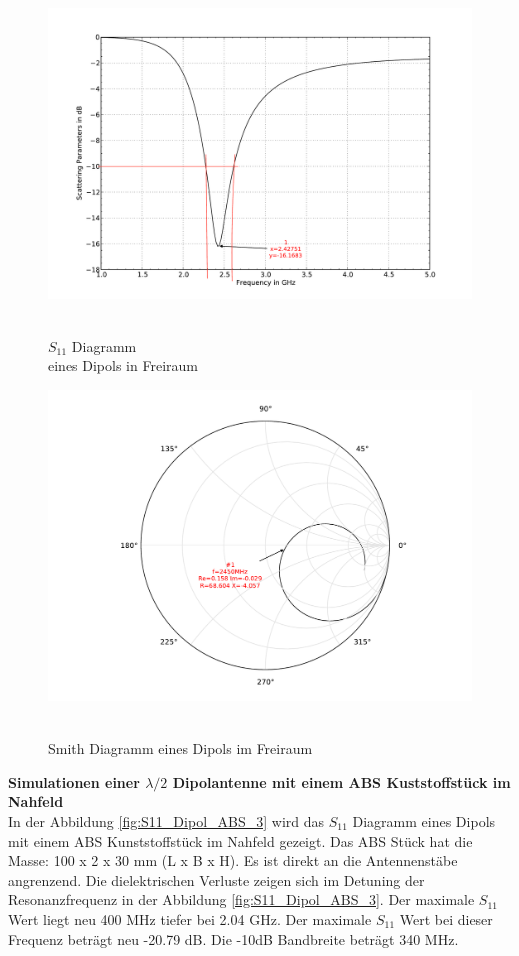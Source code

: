 \begin{figure}[!ht]
\begin{center}
  \includegraphics[width=\linewidth]{content/bilder/Evaluation/Dipol/S11DipolOhneABS.pdf}
  \caption{\\$S_{11}$ Diagramm \\eines Dipols in Freiraum}\label{fig:S11_Dipol_freiraum_1}
\endminipage%
{}
  \includegraphics[width=\linewidth]{content/bilder/Evaluation/Dipol/SmithDipolOhneABS.pdf}
  \caption{\\Smith Diagramm eines Dipols im Freiraum}\label{fig:Smith_Dipol_freiraum_2}
\endminipage
\end{center}
\end{figure}
\textbf{Simulationen einer $\lambda/2$ Dipolantenne mit einem ABS Kuststoffstück im Nahfeld}\\
In der Abbildung \ref{fig:S11_Dipol_ABS_3} wird das $S_{11}$ Diagramm eines Dipols mit einem ABS Kunststoffstück im Nahfeld gezeigt. Das ABS Stück hat die Masse: 100 x 2 x 30 mm (L x B x H). Es ist direkt an die Antennenstäbe angrenzend. Die dielektrischen Verluste zeigen sich im Detuning der Resonanzfrequenz in der Abbildung \ref{fig:S11_Dipol_ABS_3}. Der maximale $S_{11}$ Wert liegt neu 400 MHz tiefer bei 2.04 GHz. Der maximale $S_{11}$ Wert bei dieser Frequenz beträgt  neu -20.79 dB. Die -10dB Bandbreite beträgt 340 MHz.\\




